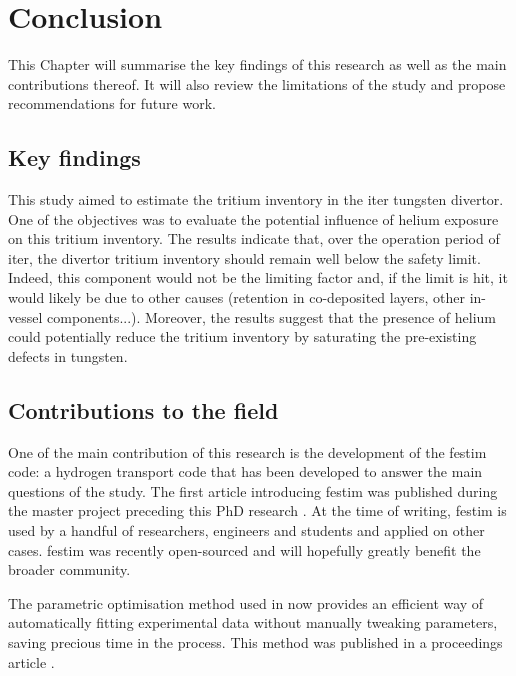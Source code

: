\setchapterpreamble[u]{\margintoc}
\chapter{Conclusion}

This Chapter will summarise the key findings of this research as well as the main contributions thereof.
It will also review the limitations of the study and propose recommendations for future work.

\section*{Key findings}

This study aimed to estimate the tritium inventory in the \gls{iter} tungsten \gls{divertor}.
One of the objectives was to evaluate the potential influence of helium exposure on this tritium inventory.
The results indicate that, over the operation period of \gls{iter}, the \gls{divertor} tritium inventory should remain well below the safety limit.
Indeed, this component would not be the limiting factor and, if the limit is hit, it would likely be due to other causes (retention in co-deposited layers, other in-vessel components...).
Moreover, the results suggest that the presence of helium could potentially reduce the tritium inventory by saturating the pre-existing defects in tungsten.

\section*{Contributions to the field}
One of the main contribution of this research is the development of the \gls{festim} code: a hydrogen transport code that has been developed to answer the main questions of the study.
The first article introducing \gls{festim} was published during the master project preceding this PhD research \cite{delaporte-mathurin_finite_2019}.
At the time of writing, \gls{festim} is used by a handful of researchers, engineers and students and applied on other cases.
\gls{festim} was recently open-sourced and will hopefully greatly benefit the broader community.

The parametric optimisation method used in  now provides an efficient way of automatically fitting experimental data without manually tweaking parameters, saving precious time in the process.
This method was published in a proceedings article \cite{delaporte-mathurin_parametric_2021}.


